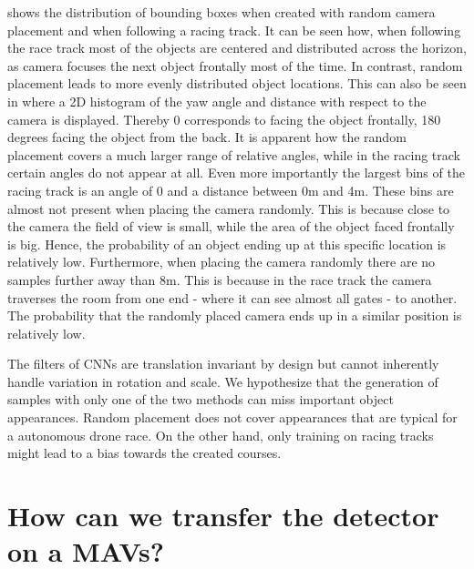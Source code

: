  shows the distribution of bounding boxes when created with random camera placement and when following a racing track. It can be seen how, when following the race track most of the objects are centered and distributed across the horizon, as camera focuses the next object frontally most of the time. In contrast, random placement leads to more evenly distributed object locations. This can also be seen in  where a 2D histogram of the yaw angle and distance with respect to the camera is displayed. Thereby 0 corresponds to facing the object frontally, 180 degrees facing the object from the back. It is apparent how the random placement covers a much larger range of relative angles, while in the racing track certain angles do not appear at all. Even more importantly the largest bins of the racing track is an angle of 0 and a distance between 0m and 4m. These bins are almost not present when placing the camera randomly. This is because close to the camera the field of view is small, while the area of the object faced frontally is big. Hence, the probability of an object ending up at this specific location is relatively low. Furthermore, when placing the camera randomly there are no samples further away than 8m. This is because in the race track the camera traverses the room from one end - where it can see almost all gates - to another. The probability that the randomly placed camera ends up in a similar position is relatively low.

The filters of \acp{CNN} are translation invariant by design but cannot inherently handle variation in rotation and scale. We hypothesize that the generation of samples with only one of the two methods can miss important object appearances. Random placement does not cover appearances that are typical for a autonomous drone race. On the other hand, only training on racing tracks might lead to a bias towards the created courses.

\section{How can we transfer the detector on a \acp{MAV}?}

